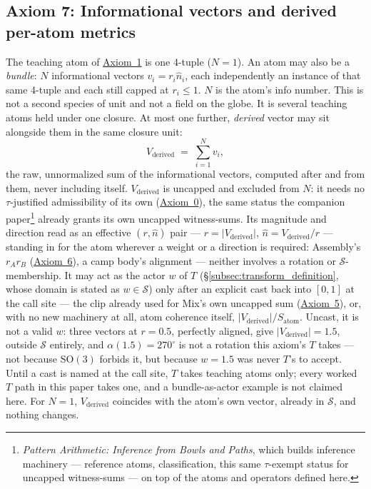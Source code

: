 \documentclass[12pt, a4paper]{article}
\begin{document}
\subsection{Axiom 7: Informational vectors and derived per-atom metrics}
\label{subsec:axiom_v1_metrics}
The teaching atom of \hyperref[subsec:axiom1]{Axiom~1} is one 4-tuple
($N=1$). An atom may also be a \emph{bundle}: $N$ informational
vectors $v_i=r_i\hat n_i$, each independently an instance of that
same 4-tuple and each still capped at $r_i\le 1$. $N$ is the atom's
info number. This is not a second species of unit and not a field
on the globe. It is several teaching atoms held under one closure. At most one
further, \emph{derived} vector may sit alongside them in the same
closure unit:
\[
V_{\text{derived}} \;=\; \sum_{i=1}^{N} v_i,
\]
the raw, unnormalized sum of the informational vectors, computed
after and from them, never including itself. $V_{\text{derived}}$ is
uncapped and excluded from $N$: it needs no $\tau$-justified
admissibility of its own (\hyperref[subsec:axiom0_admissibility]{Axiom~0}),
the same status the companion paper\footnote{\emph{Pattern
Arithmetic: Inference from Bowls and Paths}, which builds inference
machinery --- reference atoms, classification, this same
$\tau$-exempt status for uncapped witness-sums --- on top of the
atoms and operators defined here.} already grants its own uncapped
witness-sums. Its magnitude and direction read as an effective
$(r,\hat n)$ pair --- $r=\lvert V_{\text{derived}}\rvert$, $\hat n =
V_{\text{derived}}/r$ --- standing in for the atom wherever a weight
or a direction is required: Assembly's $r_Ar_B$
(\hyperref[subsec:axiom_assembly]{Axiom~6}), a camp body's alignment ---
neither involves a rotation or $\mathcal{S}$-membership. It may act
as the actor $w$ of $T$ (\S\ref{subsec:transform_definition}, whose
domain is stated as $w\in\mathcal{S}$) only after an explicit cast
back into $[0,1]$ at the call site --- the clip already used for
Mix's own uncapped sum (\hyperref[subsec:axiom_interference]{Axiom~5}), or,
with no new machinery at all, atom coherence itself, $\lvert
V_{\text{derived}}\rvert/S_{\text{atom}}$. Uncast, it is not a valid
$w$: three vectors at $r=0.5$, perfectly aligned, give $\lvert
V_{\text{derived}}\rvert=1.5$, outside $\mathcal{S}$ entirely, and
$\alpha(1.5)=270^\circ$ is not a rotation this axiom's $T$ takes ---
not because $\mathrm{SO}(3)$ forbids it, but because $w=1.5$ was
never $T$'s to accept. Until a cast is named at the call site, $T$
takes teaching atoms only; every worked $T$ path in this paper takes
one, and a bundle-as-actor example is not claimed here. For $N=1$,
$V_{\text{derived}}$ coincides with the atom's own vector, already
in $\mathcal{S}$, and nothing changes.
\end{document}
